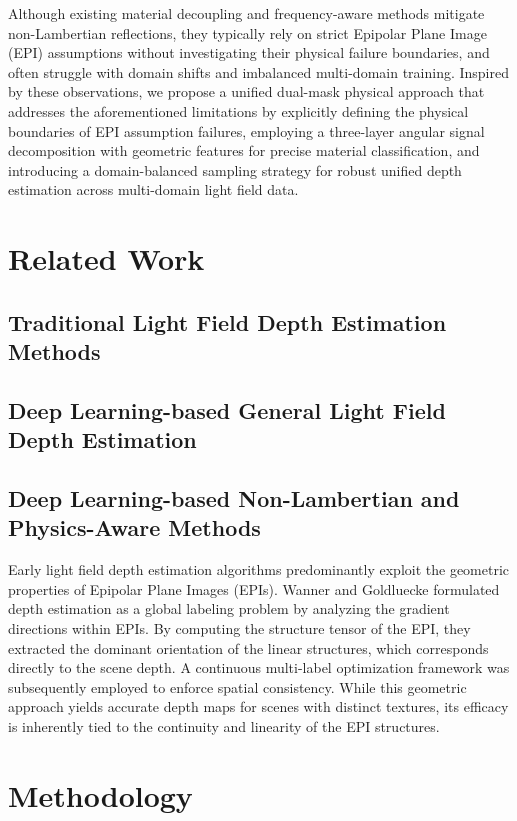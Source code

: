 \documentclass[lettersize,journal]{IEEEtran}
\begin{document}
Although existing material decoupling and frequency-aware methods mitigate non-Lambertian reflections, they typically rely on strict Epipolar Plane Image (EPI) assumptions without investigating their physical failure boundaries, and often struggle with domain shifts and imbalanced multi-domain training. Inspired by these observations, we propose a unified dual-mask physical approach that addresses the aforementioned limitations by explicitly defining the physical boundaries of EPI assumption failures, employing a three-layer angular signal decomposition with geometric features for precise material classification, and introducing a domain-balanced sampling strategy for robust unified depth estimation across multi-domain light field data.

\section{Related Work}

\subsection{Traditional Light Field Depth Estimation Methods}

\subsection{Deep Learning-based General Light Field Depth Estimation}

\subsection{Deep Learning-based Non-Lambertian and Physics-Aware Methods}

Early light field depth estimation algorithms predominantly exploit the geometric properties of Epipolar Plane Images (EPIs). Wanner and Goldluecke \cite{blinn1977} formulated depth estimation as a global labeling problem by analyzing the gradient directions within EPIs. By computing the structure tensor of the EPI, they extracted the dominant orientation of the linear structures, which corresponds directly to the scene depth. A continuous multi-label optimization framework was subsequently employed to enforce spatial consistency. While this geometric approach yields accurate depth maps for scenes with distinct textures, its efficacy is inherently tied to the continuity and linearity of the EPI structures.

\section{Methodology}
\end{document}
